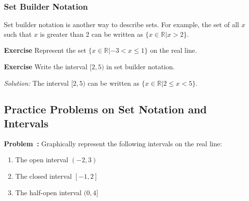 \documentclass[a4paper,12pt]{book}
\newenvironment{exercise}[1][]
  {\par\medskip\noindent\textbf{Exercise #1} \rmfamily}
  {\medskip}
\newcounter{problem}
\newenvironment{problem}[1][\theproblem]
{\refstepcounter{problem}\par\medskip\noindent\textbf{Problem~#1:} \rmfamily}{\medskip}
\newenvironment{solution}[1][]
{\par\noindent\textit{Solution:} \rmfamily}{\medskip}
\newcounter{example}
\begin{document}
\begin{center}
\end{center}


\subsubsection{Set Builder Notation}
Set builder notation is another way to describe sets. For example, the set of all \( x \) such that \( x \) is greater than 2 can be written as \( \{ x \in \mathbb{R} | x > 2 \} \).


\begin{exercise}
Represent the set \( \{ x \in \mathbb{R} | -3 < x \leq 1 \} \) on the real line.
\end{exercise}


\begin{exercise}
Write the interval \( [2, 5) \) in set builder notation.
\end{exercise}


\begin{solution}
The interval \( [2, 5) \) can be written as \( \{ x \in \mathbb{R} | 2 \leq x < 5 \} \).
\end{solution}




\subsection*{Practice Problems on Set Notation and Intervals}


\begin{problem}
Graphically represent the following intervals on the real line:
\begin{enumerate}[label=(\alph*)]
    \item The open interval \( (-2, 3) \)
    \item The closed interval \( [-1, 2] \)
    \item The half-open interval \( (0, 4] \)
\end{enumerate}
\end{problem}
\end{document}
